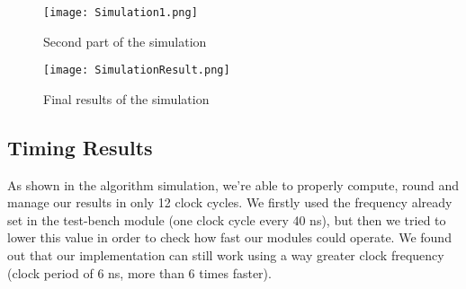 \begin{figure}[h]
	\centering
	\captionsetup{justification=centering}
	\texttt{[image: Simulation1.png]}	
	\caption{Second part of the simulation}
\end{figure}
\begin{figure}[h]
	\centering
	\captionsetup{justification=centering}
	\texttt{[image: SimulationResult.png]}	
	\caption{Final results of the simulation}
	\label{simRes}
\end{figure}


\subsection{Timing Results}
As shown in the algorithm simulation, we're able to properly compute, round and manage our results in only 12 clock cycles. We firstly used the frequency already set in the test-bench module (one clock cycle every 40 ns), but then we tried to lower this value in order to check how fast our modules could operate. We found out that our implementation can still work using a way greater clock frequency (clock period of 6 ns, more than 6 times faster). 
\clearpage